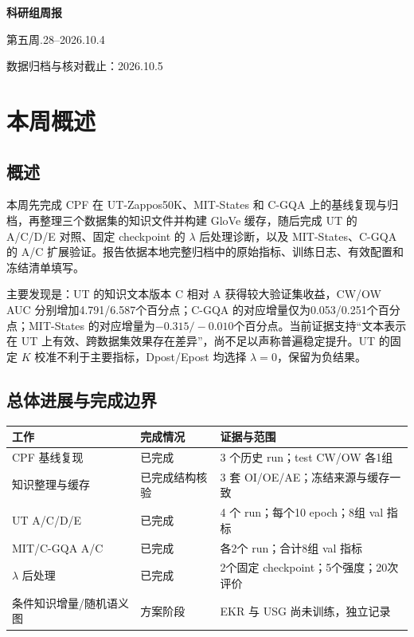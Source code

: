 \documentclass[12pt,a4paper,UTF8]{ctexart}
\newcommand{\reportperiod}{第五周\quad 2026.9.28--2026.10.4}
\newenvironment{reporttable}{\par\smallskip\begingroup\small\centering}{\par\endgroup\smallskip}
\begin{document}
\begin{center}
{\bfseries 科研组周报}\par
\vspace{0.6em}
{\normalsize\reportperiod}\par
\vspace{0.3em}
{\small 数据归档与核对截止：2026.10.5}
\end{center}
\vspace{0.5em}
\section{本周概述}
\subsection{概述}
本周先完成 CPF 在 UT-Zappos50K、MIT-States 和 C-GQA 上的基线复现与归档，再整理三个数据集的知识文件并构建 GloVe 缓存，随后完成 UT 的 A/C/D/E 对照、固定 checkpoint 的 $\lambda$ 后处理诊断，以及 MIT-States、C-GQA 的 A/C 扩展验证。报告依据本地完整归档中的原始指标、训练日志、有效配置和冻结清单填写。

主要发现是：UT 的知识文本版本 C 相对 A 获得较大验证集收益，CW/OW AUC 分别增加4.791/6.587个百分点；C-GQA 的对应增量仅为0.053/0.251个百分点；MIT-States 的对应增量为$-0.315/-0.010$个百分点。当前证据支持“文本表示在 UT 上有效、跨数据集效果存在差异”，尚不足以声称普遍稳定提升。UT 的固定 $K$ 校准不利于主要指标，Dpost/Epost 均选择 $\lambda=0$，保留为负结果。
\subsection{总体进展与完成边界}

\begin{reporttable}

\begin{tabularx}{\linewidth}{|p{3.4cm}|p{3.0cm}|Y|}
\hline

\textbf{工作} & \textbf{完成情况} & \textbf{证据与范围} \\ \hline

CPF 基线复现 & 已完成 & 3 个历史 run；test CW/OW 各1组 \\ \hline

知识整理与缓存 & 已完成结构核验 & 3 套 OI/OE/AE；冻结来源与缓存一致 \\ \hline

UT A/C/D/E & 已完成 & 4 个 run；每个10 epoch；8组 val 指标 \\ \hline

MIT/C-GQA A/C & 已完成 & 各2个 run；合计8组 val 指标 \\ \hline

$\lambda$ 后处理 & 已完成 & 2个固定 checkpoint；5个强度；20次评价 \\ \hline

条件知识增量/随机语义图 & 方案阶段 & EKR 与 USG 尚未训练，独立记录 \\ \hline

\end{tabularx}\end{reporttable}
\end{document}
